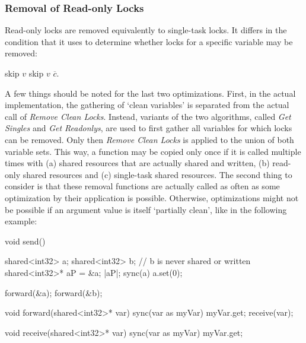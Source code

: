 \subsubsection{Removal of Read-only Locks}
Read-only locks are removed equivalently to single-task locks. It differs in the condition that it uses to determine whether locks for a specific variable may be removed: 
\begin{algorithmic}
 
    \State skip $v$
    \State skip $v$
  \EndIf
  \State $\overline{c}$. 
\EndFor
\State {}
\EndFunction
\end{algorithmic}
A few things should be noted for the last two optimizations. First, in the actual implementation, the gathering of `clean variables' is separated from the actual call of \textit{Remove Clean Locks}. Instead, variants of the two algorithms, called \textit{Get Singles} and \textit{Get Readonlys}, are used to first gather all variables for which locks can be removed. Only then \textit{Remove Clean Locks} is applied to the union of both variable sets. This way, a function may be copied only once if it is called multiple times with (a) shared resources that are actually shared and written, (b) read-only shared resources and (c) single-task shared resources. The second thing to consider is that these removal functions are actually called as often as some optimization by their application is possible. Otherwise, optimizations might not be possible if an argument value is itself `partially clean', like  in the following example:
\begin{ccode}
void send() {
  shared<int32> a;
  shared<int32> b;          // b is never shared or written
  shared<int32>* aP = &a;
  |aP|;
  sync(a) { a.set(0); }
  
  forward(&a);
  forward(&b);
}

void forward(shared<int32>* var) {
  sync(var as myVar) { myVar.get; }
  receive(var);
}

void receive(shared<int32>* var) {
  sync(var as myVar) { myVar.get; }
}
\end{ccode} 
